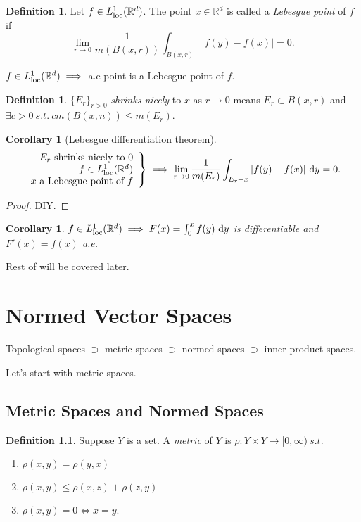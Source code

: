 \documentclass{report}
\newcommand{\R}{\mathbb{R}}
\newcommand{\st}{\ s.t.\ }
\newcommand{\df}{\ \mathrm{d}}
\newtheorem{corollary}[theorem]{Corollary}
\theoremstyle{definition}
\newtheorem{definition}[theorem]{Definition}
\theoremstyle{remark}
\begin{document}
\begin{definition}
	Let $f \in L^1_{\textup{loc}}(\R^d)$. The point $x \in \R^d$ is called a \emph{Lebesgue point} of $f$ if 
	\[
		\lim_{r \to 0} \frac{1}{m(B(x, r))} \int_{B(x, r)} |f(y) - f(x)| = 0.	
	\]
\end{definition}
$f \in L^1_{\textup{loc}}(\R^d) \implies$ a.e point is a Lebesgue point of $f$.

\begin{definition}
	$\{E_r\}_{r > 0}$ \emph{shrinks nicely} to $x$ as $r \to 0$ means $E_r \subset B(x, r)$ and $\exists c > 0 \st cm(B(x, n)) \leq m(E_r)$.
\end{definition}

\begin{corollary}[Lebesgue differentiation theorem]
	\[\left.
		\begin{array}{r}
		E_r \text{ shrinks nicely to } 0 \\
		f \in L^1_{\textup{loc}}(\R^d) \\
		x \text{ a Lebesgue point of } f
	\end{array}\right\rbrace \implies \lim_{r \to 0} \frac{1}{m(E_r)}\int_{E_r + x} |f(y) - f(x)| \df y = 0.\]
\end{corollary}
\begin{proof}
	DIY.
\end{proof}

\begin{corollary}
	$f \in L^1_{\textup{loc}}(\R^d) \implies F(x) = \int_0^x f(y) \df y$ is differentiable and $F'(x) = f(x)$ a.e.
\end{corollary}

Rest of \cite[Ch.3]{follandRealAnalysisModern1999} will be covered later.

\chapter{Normed Vector Spaces}
Topological spaces $\supset$ metric spaces $\supset$ normed spaces $\supset$ inner product spaces.

Let's start with metric spaces. \cite[5.1, 6.1, 6.2]{follandRealAnalysisModern1999}

\section{Metric Spaces and Normed Spaces}
\begin{definition}
	Suppose $Y$ is a set. A \emph{metric} of $Y$ is $\rho: Y \times Y \to [0, \infty) \st$
	\begin{enumerate}
		\item $\rho(x, y) = \rho(y, x)$
		\item $\rho(x, y) \leq \rho(x, z) + \rho(z, y)$
		\item $\rho(x, y) = 0 \iff x = y$.
	\end{enumerate}
\end{definition}
\end{document}
